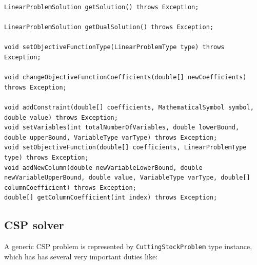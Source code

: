 \documentclass[10pt,a4paper]{article}
\begin{document}
\begin{adjustwidth}{-2cm}{-2cm}
\begin{lstlisting}[frame=lines, caption={Some methods exported by \texttt{LinearProblem} interface.}, label={code:LinearProblem}]
LinearProblemSolution getSolution() throws Exception; 
  
LinearProblemSolution getDualSolution() throws Exception;

void setObjectiveFunctionType(LinearProblemType type) throws Exception;

void changeObjectiveFunctionCoefficients(double[] newCoefficients) throws Exception;

void addConstraint(double[] coefficients, MathematicalSymbol symbol, double value) throws Exception;
void setVariables(int totalNumberOfVariables, double lowerBound, double upperBound, VariableType varType) throws Exception;
void setObjectiveFunction(double[] coefficients, LinearProblemType type) throws Exception;
void addNewColumn(double newVariableLowerBound, double newVariableUpperBound, double value, VariableType varType, double[] columnCoefficient) throws Exception;
double[] getColumnCoefficient(int index) throws Exception;
\end{lstlisting}
\end{adjustwidth} 

\subsection{CSP solver}

A generic CSP problem is represented by \texttt{CuttingStockProblem} type instance, which has has several very important duties like:
\end{document}
